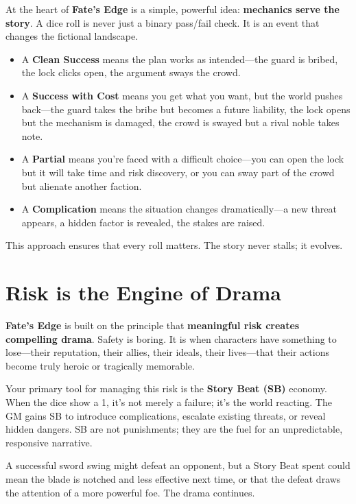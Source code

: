 At the heart of \textbf{Fate's Edge} is a simple, powerful idea: \textbf{mechanics serve the story}. A dice roll is never just a binary pass/fail check. It is an event that changes the fictional landscape.

\begin{itemize}
    \item A \textbf{Clean Success} means the plan works as intended—the guard is bribed, the lock clicks open, the argument sways the crowd.
    \item A \textbf{Success with Cost} means you get what you want, but the world pushes back—the guard takes the bribe but becomes a future liability, the lock opens but the mechanism is damaged, the crowd is swayed but a rival noble takes note.
    \item A \textbf{Partial} means you're faced with a difficult choice—you can open the lock but it will take time and risk discovery, or you can sway part of the crowd but alienate another faction.
    \item A \textbf{Complication} means the situation changes dramatically—a new threat appears, a hidden factor is revealed, the stakes are raised.
\end{itemize}

This approach ensures that every roll matters. The story never stalls; it evolves.

\section*{Risk is the Engine of Drama}

\textbf{Fate's Edge} is built on the principle that \textbf{meaningful risk creates compelling drama}. Safety is boring. It is when characters have something to lose—their reputation, their allies, their ideals, their lives—that their actions become truly heroic or tragically memorable.

Your primary tool for managing this risk is the \textbf{Story Beat (SB)} economy. When the dice show a 1, it's not merely a failure; it's the world reacting. The GM gains SB to introduce complications, escalate existing threats, or reveal hidden dangers. SB are not punishments; they are the fuel for an unpredictable, responsive narrative.

A successful sword swing might defeat an opponent, but a Story Beat spent could mean the blade is notched and less effective next time, or that the defeat draws the attention of a more powerful foe. The drama continues.

